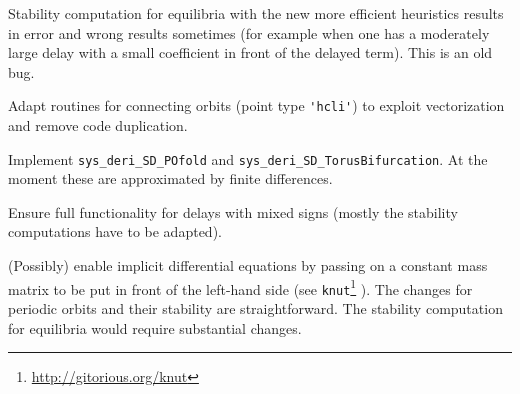 \documentclass[11pt]{scrartcl}
\newcommand{\blist}[1]{\mbox{\lstinline!#1!}}  \newlength{\tabw}
\begin{document}
\begin{compactitem}
\item Stability computation for equilibria with the new more efficient
  heuristics results in error and wrong results sometimes (for example
  when one has a moderately large delay with a small coefficient in
  front of the delayed term). This is an old bug.
\item Adapt routines for connecting orbits (point type
  \blist{'hcli'}) to exploit vectorization and remove code duplication.
\item Implement \blist{sys_deri_SD_POfold} and
  \blist{sys_deri_SD_TorusBifurcation}. At the moment these are
  approximated by finite differences.
\item Ensure full functionality for delays with mixed signs (mostly
  the stability computations have to be adapted).
\item (Possibly) enable implicit differential equations by passing on
  a constant mass matrix to be put in front of the left-hand side (see
  \texttt{knut}\footnote{\url{http://gitorious.org/knut}}
  \cite{RS07}). The changes for periodic orbits and their stability
  are straightforward. The stability computation for equilibria would
  require substantial changes.
\end{compactitem}

{\small 
}
\end{document}
